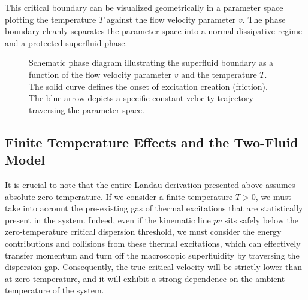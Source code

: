This critical boundary can be visualized geometrically in a parameter space plotting the temperature \( T \) against the flow velocity parameter \( v \). The phase boundary cleanly separates the parameter space into a normal dissipative regime and a protected superfluid phase.

\begin{figure}[H]
    \centering
    \caption{Schematic phase diagram illustrating the superfluid boundary as a function of the flow velocity parameter \( v \) and the temperature \( T \). The solid curve defines the onset of excitation creation (friction). The blue arrow depicts a specific constant-velocity trajectory traversing the parameter space.}
    \label{fig:superfluid_phase_diagram}
\end{figure}

\subsection{Finite Temperature Effects and the Two-Fluid Model}

It is crucial to note that the entire Landau derivation presented above assumes absolute zero temperature. If we consider a finite temperature \( T > 0 \), we must take into account the pre-existing gas of thermal excitations that are statistically present in the system. Indeed, even if the kinematic line \( pv \) sits safely below the zero-temperature critical dispersion threshold, we must consider the energy contributions and collisions from these thermal excitations, which can effectively transfer momentum and turn off the macroscopic superfluidity by traversing the dispersion gap. Consequently, the true critical velocity will be strictly lower than at zero temperature, and it will exhibit a strong dependence on the ambient temperature of the system.

